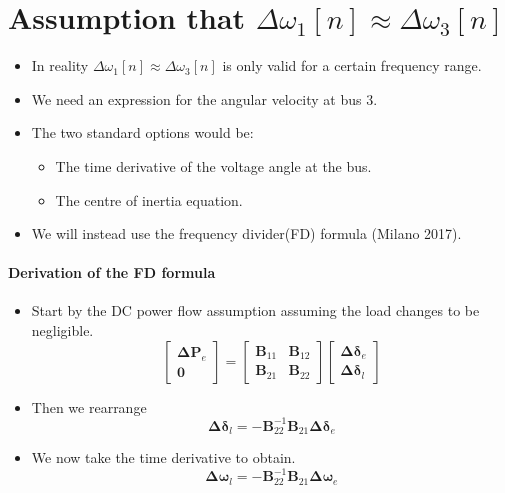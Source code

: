\section{Assumption that $\Delta \omega_1[n] \approx \Delta \omega_3[n]$}
\begin{frame}{\secname}
	\begin{itemize}
		\item In reality $\Delta \omega_1[n] \approx \Delta \omega_3[n]$ is only valid for a certain frequency range.
		\item We need an expression for the angular velocity at bus $3$.
		\item The two standard options would be:
			\begin{itemize}
				\item The time derivative of the voltage angle at the bus.
				\item The centre of inertia equation.
			\end{itemize}
		\item We will instead use the frequency divider(FD) formula (Milano 2017).
	\end{itemize}
\end{frame}
\begin{frame}{\secname}
	\framesubtitle{Derivation of the FD formula}
	\begin{itemize}
		\item Start by the DC power flow assumption assuming the load changes to be negligible.
		\begin{equation}
			\begin{bmatrix}
				\boldsymbol{\Delta P}_{e} \\ \boldsymbol{0}
			\end{bmatrix}
			=
			\begin{bmatrix}
				\boldsymbol{B}_{11} & \boldsymbol{B}_{12} \\
				\boldsymbol{B}_{21} & \boldsymbol{B}_{22}
			\end{bmatrix}
			\begin{bmatrix}
				\boldsymbol{\Delta \delta}_e \\
				\boldsymbol{\Delta \delta}_l
			\end{bmatrix}
		\end{equation}
		\item Then we rearrange
		\begin{equation}\label{eq:theta_l}
			\boldsymbol{\Delta \delta}_l = -\boldsymbol{B}_{22}^{-1}\boldsymbol{B}_{21}\boldsymbol{\Delta \delta}_e
		\end{equation}
		\item We now take the time derivative to obtain.
		\begin{equation}\label{eq:theta_l}
			\boldsymbol{\Delta \omega}_l = -\boldsymbol{B}_{22}^{-1}\boldsymbol{B}_{21}\boldsymbol{\Delta \omega}_e
		\end{equation}
	\end{itemize}
\end{frame}
